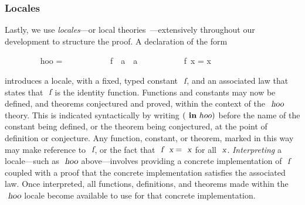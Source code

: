 \subsubsection{Locales}\label{sect.isabelle.locales}

Lastly, we use \emph{locales}---or local theories~\cite{DBLP:conf/tphol/KammullerWP99,DBLP:conf/types/HaftmannW08}---extensively throughout our development to structure the proof.
A declaration of the form
\vspace{0.375em}
\begin{isabellebody}
\ \ \ \ \ \ \ \  hoo = \isanewline
\ \ \ \ \ \ \ \ \ \ \ f\ {\isacharcolon}{\isacharcolon}\ {\isachardoublequoteopen}{\isacharprime}a\ {\isasymRightarrow}\ {\isacharprime}a{\isachardoublequoteclose}\isanewline
\ \ \ \ \ \ \ \ \ \  {\isachardoublequoteopen}f\ x = x{\isachardoublequoteclose}
\end{isabellebody}
\vspace{0.375em}
\noindent
introduces a locale, with a fixed, typed constant $\isa{f}$, and an associated law that states that $\isa{f}$ is the identity function.
Functions and constants may now be defined, and theorems conjectured and proved, within the context of the $\isa{hoo}$ theory.
This is indicated syntactically by writing $(\isacommand{in}\ hoo)$ before the name of the constant being defined, or the theorem being conjectured, at the point of definition or conjecture.
Any function, constant, or theorem, marked in this way may make reference to $\isa{f}$, or the fact that $\isa{f}\ \isa{x} = \isa{x}$ for all $\isa{x}$.
\emph{Interpreting} a locale---such as $\isa{hoo}$ above---involves providing a concrete implementation of $\isa{f}$ coupled with a proof that the concrete implementation satisfies the associated law.
Once interpreted, all functions, definitions, and theorems made within the $\isa{hoo}$ locale become available to use for that concrete implementation.
